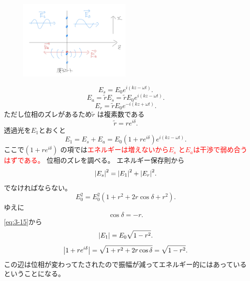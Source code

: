 \documentclass[dvipdfmx,12pt]{jsarticle}
\begin{document}
\begin{figure}[H]
	\centering
	\includegraphics[width=0.5\textwidth]{fig3/Fig-3.jpg}
	\label{fig:fig3-Fig-3-jpg}
\end{figure}

\[
E_s=E_0e^{i(kz-\omega t)}
.\] 
\[
	E_a=\tilde{r}E_s=\tilde{r}E_0e^{i(kz-\omega t)}
.\] 
\begin{equation}
\label{eq:3-13}
E_r=\tilde{r}E_0e^{-i(kz+\omega t)}
.\end{equation}
ただし位相のズレがあるため$\tilde{r}$ は複素数である
\begin{equation}
\label{eq:3-14}
\tilde{r}=re^{i\delta}
.\end{equation}
透過光を$E_1$とおくと
\begin{equation}
\label{eq:3-15}
	E_1=E_s+E_a=E_0(1+re^{i\delta})e^{i(kz-\omega t)}
.\end{equation}
ここで$(1+re^{i\delta})$ の項では\textcolor{red}{エネルギーは増えないから$E_s$ と$E_a$は干渉で弱め合うはずである。}
位相のズレを調べる。
エネルギー保存則から
\begin{equation}
\label{eq:3-16}
	\abs{E_s}^2=\abs{E_1}^2+\abs{E_r}^2
.\end{equation}
でなければならない。
	\[
	E_0^2=E_0^2(1+r^2+2r\cos \delta+r^2)
	.\] 
	ゆえに
	\begin{equation}
	\label{eq:3-17}
		\cos \delta=-r
	.\end{equation}
	\eqref{eq:3-15}から
\begin{equation}
\label{eq:3-18}
	\abs{E_1}=E_0\sqrt{1-r^2} 
.\end{equation}
\[
\abs{1+re^{i\delta}}=\sqrt{1+r^2+2r\cos \delta} =\sqrt{1-r^2} 
.\] 
この辺は位相が変わってたされたので振幅が減ってエネルギー的にはあっているということになる。
\end{document}
